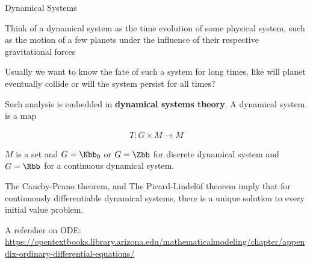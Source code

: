 \documentclass[aspectratio=169,xcolor=dvipsnames,svgnames,x11names,fleqn]{beamer}
\begin{document}
\begin{frame}{Dynamical Systems}

\footnotesize

\begin{tcolorbox}
Think of a dynamical system as the time evolution of some physical
system, such as the motion of a few planets under the influence of their
respective gravitational forces
\end{tcolorbox}

\vspace{6pt}

Usually we want to know the fate of such a system for long times, like will planet eventually collide or will the system persist for all times?

\vspace{6pt}

Such analysis is embedded in \textbf{dynamical systems theory}. A dynamical system is a map

\begin{align*}
T: G\times M \to M
\end{align*}

$M$ is a set and $G = \Nbb_0$ or $G = \Zbb$ for discrete dynamical system and $G = \Rbb$ for a continuous dynamical system.

\vspace{6pt}

\begin{tcolorbox}[colframe=uiRose, title=~~]
The Cauchy-Peano theorem, and The Picard-Lindelöf theorem  imply that for continuously differentiable dynamical systems,  there is a unique solution to every initial value problem.
\end{tcolorbox}

\scriptsize

A refersher on ODE: \url{https://opentextbooks.library.arizona.edu/mathematicalmodeling/chapter/appendix-ordinary-differential-equations/}



\end{frame}    
\end{document}
